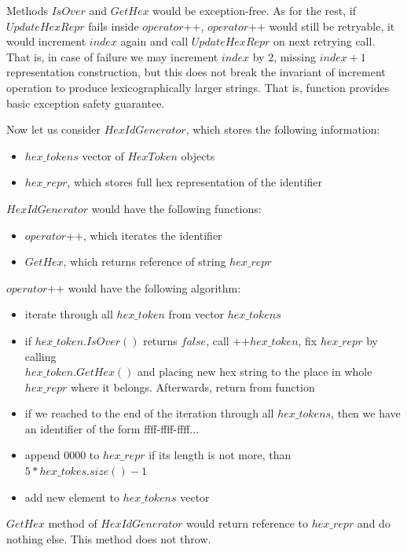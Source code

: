 \documentclass{article}
\begin{document}
Methods $IsOver$ and $GetHex$ would be exception-free. As for the rest, if $UpdateHexRepr$ fails inside $operator\mbox{++}$, $operator\mbox{++}$ would still be retryable, it would increment $index$ again and call $UpdateHexRepr$ on next retrying call. That is, in case of failure we may increment $index$ by 2, missing $index + 1$ representation construction, but this does not break the invariant of increment operation to produce lexicographically larger strings. That is, function provides basic exception safety guarantee.

Now let us consider $HexIdGenerator$, which stores the following information:
\begin{itemize}
	\item $hex\_tokens$ vector of $HexToken$ objects
	\item $hex\_repr$, which stores full hex representation of the identifier
\end{itemize}

$HexIdGenerator$ would have the following functions:
\begin{itemize}
	\item $operator\mbox{++}$, which iterates the identifier
	\item $GetHex$, which returns reference of string $hex\_repr$
\end{itemize}

$operator\mbox{++}$ would have the following algorithm:
\begin{itemize}
	\item iterate through all $hex\_token$ from vector $hex\_tokens$
	\item if $hex\_token.IsOver()$ returns $false$, call $\mbox{++}hex\_token$, fix $hex\_repr$ by calling \\
		$hex\_token.GetHex()$ and placing new hex string to the place in whole $hex\_repr$ where it belongs. Afterwards, return from function
	\item if we reached to the end of the iteration through all $hex\_tokens$, then we have an identifier of the form ffff-ffff-ffff...
	\item append 0000 to $hex\_repr$ if its length is not more, than $5 * hex\_tokes.size() - 1$
	\item add new element to $hex\_tokens$ vector
\end{itemize}

$GetHex$ method of $HexIdGenerator$ would return reference to $hex\_repr$ and do nothing else. This method does not throw.
\end{document}
